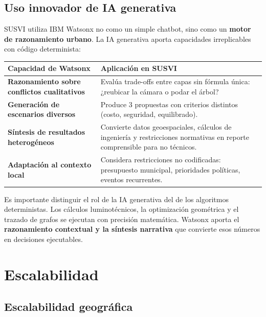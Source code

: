 \documentclass[12pt,a4paper]{article}
\begin{document}
\subsection{Uso innovador de IA generativa}

SUSVI utiliza IBM Watsonx no como un simple chatbot, sino como un \textbf{motor de razonamiento urbano}. La IA generativa aporta capacidades irreplicables con código determinista:

\begin{table}[H]
\centering
\small
\renewcommand{\arraystretch}{1.3}
\begin{tabularx}{\textwidth}{>{\bfseries}l X}
\toprule
\rowcolor{azuloscuro}
\color{white}\textbf{Capacidad de Watsonx} & \color{white}\textbf{Aplicación en SUSVI} \\
\midrule
Razonamiento sobre conflictos cualitativos & Evalúa trade-offs entre capas sin fórmula única: ¿reubicar la cámara o podar el árbol? \\
\rowcolor{fondoazul}
Generación de escenarios diversos & Produce 3 propuestas con criterios distintos (costo, seguridad, equilibrado). \\
Síntesis de resultados heterogéneos & Convierte datos geoespaciales, cálculos de ingeniería y restricciones normativas en reporte comprensible para no técnicos. \\
\rowcolor{fondoazul}
Adaptación al contexto local & Considera restricciones no codificadas: presupuesto municipal, prioridades políticas, eventos recurrentes. \\
\bottomrule
\end{tabularx}
\end{table}

Es importante distinguir el rol de la IA generativa del de los algoritmos deterministas. Los cálculos luminotécnicos, la optimización geométrica y el trazado de grafos se ejecutan con precisión matemática. Watsonx aporta el \textbf{razonamiento contextual y la síntesis narrativa} que convierte esos números en decisiones ejecutables.


\newpage
\section{Escalabilidad}

\subsection{Escalabilidad geográfica}
\end{document}
